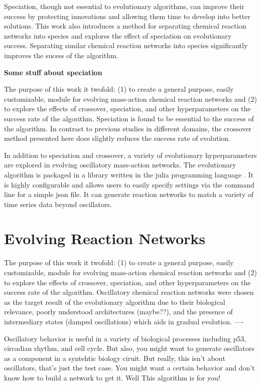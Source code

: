 \documentclass[12pt]{report}
\begin{document}
Speciation, though not essential to evolutionary algorithms, can improve their success by protecting innovations and allowing them time to develop into better solutions. This work also introduces a method for separating chemical reaction networks into species and explores the effect of speciation on evolutionary success. Separating similar chemical reaction networks into species significantly improves the sucess of the algorithm.

\textbf{Some stuff about speciation}

The purpose of this work it twofold: (1) to create a general purpose, easily customizable, module for evolving mass-action chemical reaction networks and (2) to explore the effects of crossover, speciation, and other hyperparameters on the success rate of the algorithm. Speciation is found to be essential to the success of the algorithm. In contrast to previous studies in different domains, the crossover method presented here does slightly reduces the success rate of evolution. 


In addition to speciation and crossover, a variety of evolutionary hyperparameters are explored in evolving oscillatory mass-action networks. The evolutionary algorithm is packaged in a library written in the julia programming language \cite{bezanson2017julia}. It is highly configurable and allows users to easily specify settings via the command line for a simple json file. It can generate reaction networks to match a variety of time series data beyond oscillators.




\section{Evolving Reaction Networks}
The purpose of this work it twofold: (1) to create a general purpose, easily customizable, module for evolving mass-action chemical reaction networks and (2) to explore the effects of crossover,  speciation, and other hyperparameters on the success rate of the algorithm. Oscillatory chemical reaction networks were chosen as the target result of the evolutionary algorithm due to their biological relevance, poorly understood architectures (maybe??), and the presence of intermediary states (damped oscillations) which aids in gradual evolution.
----

Oscillatory behavior is useful in a variety of biological processes including p53, circadian rhythm, and cell cycle. But also, you might want to generate oscillators as a component in a syntehtic biology ciruit. But really, this isn't about oscillators, that's just the test case. You might want a certain behavior and don't know how to build a  network to get it. Well This algorithm is for you! 
\end{document}
